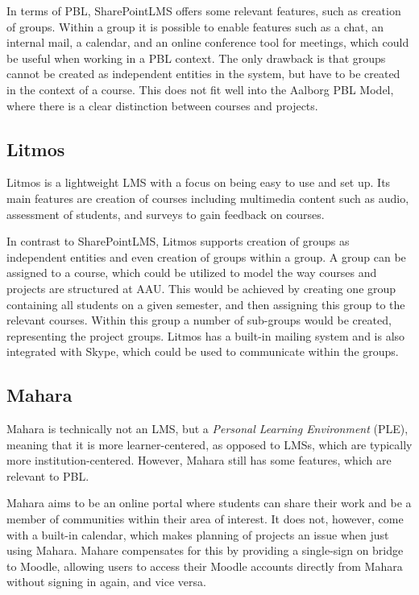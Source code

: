 In terms of PBL, SharePointLMS offers some relevant features, such as creation of groups.
Within a group it is possible to enable features such as a chat, an internal mail, a calendar, and an online conference tool for meetings, which could be useful when working in a PBL context.
The only drawback is that groups cannot be created as independent entities in the system, but have to be created in the context of a course.
This does not fit well into the Aalborg PBL Model, where there is a clear distinction between courses and projects.

\subsection{Litmos}
Litmos \citep{litmos} is a lightweight LMS with a focus on being easy to use and set up.
Its main features are creation of courses including multimedia content such as audio, assessment of students, and surveys to gain feedback on courses.

In contrast to SharePointLMS, Litmos supports creation of groups as independent entities and even creation of groups within a group.
A group can be assigned to a course, which could be utilized to model the way courses and projects are structured at AAU.
This would be achieved by creating one group containing all students on a given semester, and then assigning this group to the relevant courses.
Within this group a number of sub-groups would be created, representing the project groups.
Litmos has a built-in mailing system and is also integrated with Skype, which could be used to communicate within the groups.


\subsection{Mahara}
Mahara \citep{mahara} is technically not an LMS, but a \emph{Personal Learning Environment} (PLE), meaning that it is more learner-centered, as opposed to LMSs, which are typically more institution-centered.
However, Mahara still has some features, which are relevant to PBL.

Mahara aims to be an online portal where students can share their work and be a member of communities within their area of interest.
It does not, however, come with a built-in calendar, which makes planning of projects an issue when just using Mahara.
Mahare compensates for this by providing a single-sign on bridge to Moodle, allowing users to access their Moodle accounts directly from Mahara without signing in again, and vice versa.

